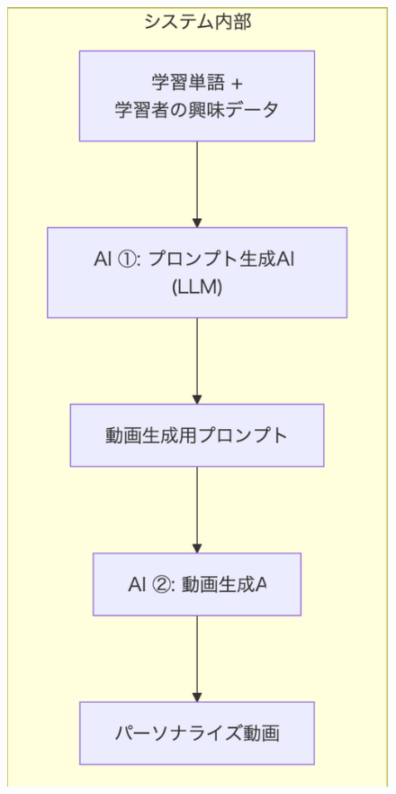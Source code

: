 \documentclass[titlepage,a4paper]{jsarticle}
\begin{document}
\begin{figure}[H]
    \centering
    \begin{minipage}[t]{0.2\textwidth}
        \centering
        \includegraphics[width=\textwidth]{img/sysin.png}

\end{minipage}
\end{figure}
\end{document}
